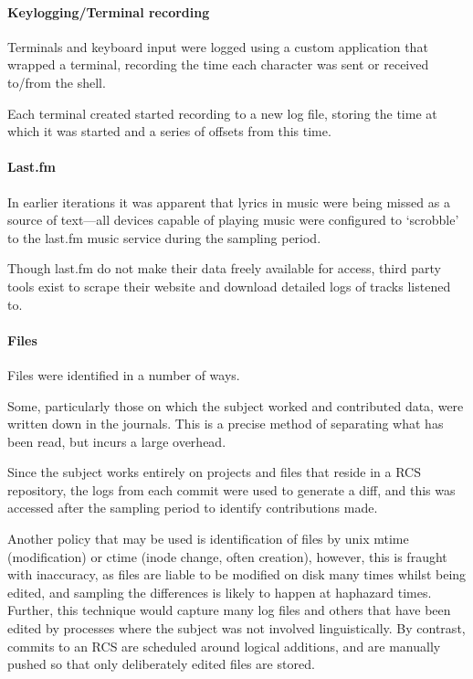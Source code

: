 \paragraph{Keylogging/Terminal recording}
Terminals and keyboard input were logged using a custom application that wrapped a terminal, recording the time each character was sent or received to/from the shell.

Each terminal created started recording to a new log file, storing the time at which it was started and a series of offsets from this time.

\paragraph{Last.fm}
In earlier iterations it was apparent that lyrics in music were being missed as a source of text---all devices capable of playing music were configured to `scrobble' to the last.fm music service during the sampling period.

Though last.fm do not make their data freely available for access, third party tools exist to scrape their website and download detailed logs of tracks listened to.

\paragraph{Files}
Files were identified in a number of ways.

Some, particularly those on which the subject worked and contributed data, were written down in the journals.  This is a precise method of separating what has been read, but incurs a large overhead.

Since the subject works entirely on projects and files that reside in a RCS repository, the logs from each commit were used to generate a diff, and this was accessed after the sampling period to identify contributions made.

Another policy that may be used is identification of files by unix mtime (modification) or ctime (inode change, often creation), however, this is fraught with inaccuracy, as files are liable to be modified on disk many times whilst being edited, and sampling the differences is likely to happen at haphazard times.  Further, this technique would capture many log files and others that have been edited by processes where the subject was not involved linguistically.  By contrast, commits to an RCS are scheduled around logical additions, and are manually pushed so that only deliberately edited files are stored.

